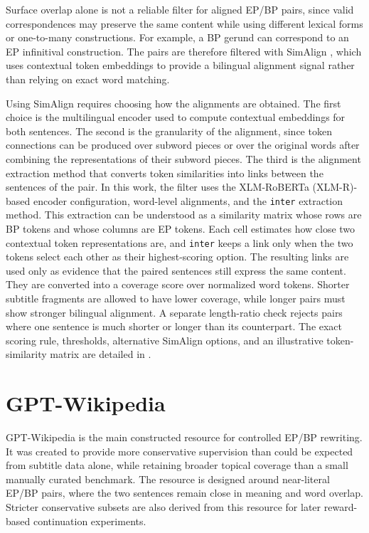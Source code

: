 {
Surface overlap alone is not a reliable filter for aligned EP/BP pairs, since
valid correspondences may preserve the same content while using different
lexical forms or one-to-many constructions. For example, a BP gerund can
correspond to an EP infinitival construction. The pairs are therefore filtered
with SimAlign \citep{jalili-sabet-etal-2020-simalign}, which uses contextual
token embeddings to provide a bilingual alignment signal rather than relying
on exact word matching.\par}

{
Using SimAlign requires choosing how the alignments are obtained. The first
choice is the multilingual encoder used to compute contextual embeddings for
both sentences. The second is the granularity of the alignment, since token
connections can be produced over subword pieces or over the original words
after combining the representations of their subword pieces.
The third is the alignment extraction method that converts token similarities
into links between the sentences of the pair. In this work, the filter uses the
XLM-RoBERTa (XLM-R)-based encoder configuration, word-level alignments, and the
\texttt{inter} extraction method. This extraction can be understood as a
similarity matrix whose rows are BP tokens and whose columns are EP tokens.
Each cell estimates how close two contextual token representations are, and
\texttt{inter} keeps a link only when the two tokens select each other as their
highest-scoring option. The resulting links are used only as evidence that the
paired sentences still express the same content. They are converted into a coverage
score over normalized word tokens. Shorter subtitle fragments are allowed to
have lower coverage, while longer pairs must show stronger bilingual
alignment. A separate length-ratio check rejects pairs where one sentence is
much shorter or longer than its counterpart. The exact scoring rule, thresholds,
alternative SimAlign options, and an illustrative token-similarity matrix are detailed in
.\par}

\section{GPT-Wikipedia}
\label{sec:data-gpt-wikipedia}

{
GPT-Wikipedia is the main constructed resource for controlled EP/BP
rewriting. It was created to provide more conservative supervision than could
be expected from subtitle data alone, while retaining broader topical coverage
than a small manually curated benchmark. The resource is designed around
near-literal EP/BP pairs, where the two sentences remain close in meaning and
word overlap. Stricter
conservative subsets are also derived from this resource for later
reward-based continuation experiments.\par}

